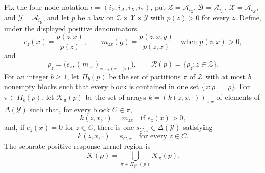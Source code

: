 Fix the four-node notation \(\iota=(i_Z,i_A,i_X,i_Y)\), put
\(\mathcal Z=\mathcal A_{i_Z}\), \(\mathcal B=\mathcal A_{i_A}\),
\(\mathcal X=\mathcal A_{i_X}\), and
\(\mathcal Y=\mathcal A_{i_Y}\), and let \(p\) be a law on
\(\mathcal Z\times\mathcal X\times\mathcal Y\) with \(p(z)>0\) for every
\(z\).  Define, under the displayed positive denominators,
\[
 e_z(x)=\frac{p(z,x)}{p(z)},
 \qquad
 m_{zx}(y)=\frac{p(z,x,y)}{p(z,x)}\quad\text{when }p(z,x)>0,
\]
and
\[
 \rho_z=\bigl(e_z,(m_{zx})_{x:e_z(x)>0}\bigr),
 \qquad
 \mathcal R(p)=\{\rho_z:z\in\mathcal Z\}.
\]
For an integer \(b\geq1\), let \(\Pi_b(p)\) be the set of partitions
\(\pi\) of \(\mathcal Z\) with at most \(b\) nonempty blocks such that
every block is contained in one set \(\{z:\rho_z=\rho\}\).  For
\(\pi\in\Pi_b(p)\), let \(\mathcal K_\pi(p)\) be the set of arrays
\(k=(k(z,x,\cdot))_{z,x}\) of elements of \(\Delta(\mathcal Y)\) such
that, for every block \(C\in\pi\),
\[
 k(z,x,\cdot)=m_{zx}\quad\text{if }e_z(x)>0,
\]
and, if \(e_z(x)=0\) for \(z\in C\), there is one
\(s_{C,x}\in\Delta(\mathcal Y)\) satisfying
\[
 k(z,x,\cdot)=s_{C,x}\quad\text{for every }z\in C.
\]
The separate-positive response-kernel region is
\[
 \mathcal K(p)=
 \bigcup_{\pi\in\Pi_{|\mathcal B|}(p)}\mathcal K_\pi(p).
\]